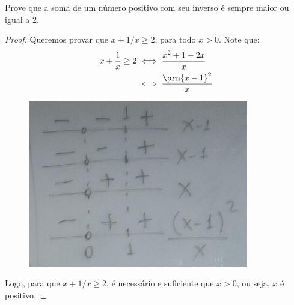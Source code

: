 \begin{example}
Prove que a soma de um número positivo com seu inverso é sempre maior ou igual a 2.
\end{example}

\begin{proof}
Queremos provar que $x+1/x\ge 2$, para todo $x > 0$. Note que:
%
\begin{align*}
x+\dfrac{1}{x}\ge 2 &\iff \dfrac{x^2+1-2x}{x} \\
		&\iff \dfrac{\prn{x-1}^2}{x}
\end{align*}

\begin{figure}[H]
\centering
\includegraphics{../../res/img/[ok]photo_2018-08-24_22-55-35(2).jpg}
\caption{}
\end{figure}

Logo, para que $x+1/x\ge 2$, é necessário e suficiente que $x > 0$, ou seja, $x$ é positivo.
\end{proof}